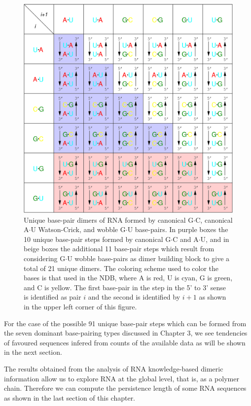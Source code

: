 \begin{figure}
\centering
\includegraphics[angle=0, scale=0.4]{Chapter4/unique.png}
\caption{Unique base-pair dimers of RNA formed by canonical G$\cdot$C,
  canonical    A$\cdot$U    Watson-Crick,    and   wobble    G$\cdot$U
  base-pairs.  In purple  boxes the  10 unique  base-pair steps
  formed  by canonical G$\cdot$C  and A$\cdot$U,  and in  beige boxes
  the  additional  11   base-pair  steps  which   result  from
  considering G$\cdot$U  wobble base-pairs as dimer  building block to
  give a total of 21 unique  dimers. The coloring scheme used to color
  the bases is that  used in the NDB, where A is red,  U is cyan, G is
  green, and C is yellow. The first  base-pair in the step in the 5' to
  3' sense is  identified as pair $i$ and the  second is identified by
  $i+1$ as shown in the upper left corner of this figure.}
\label{fig:unique}
\end{figure}  

For the  case of the possible  91 unique base-pair steps  which can be
formed from the seven  dominant base-pairing types discussed in Chapter
3,  we see tendencies of favoured sequences infered from counts of the
available data as will be shown in the next section. 

The results obtained from  the analysis of RNA knowledge-based dimeric
information allow us to explore RNA at the global level, that is, as a
polymer  chain. Therefore we can compute  the  persistence  length  of
some  RNA sequences as shown in the last section of this chapter.

